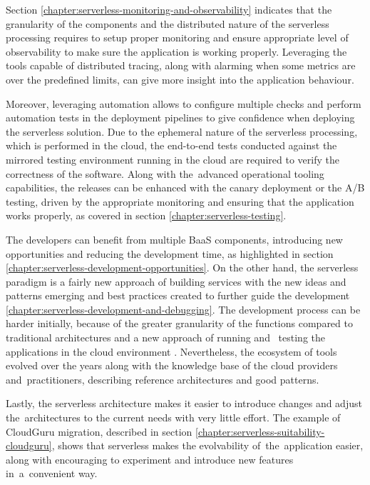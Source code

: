 Section \ref{chapter:serverless-monitoring-and-observability} indicates that the granularity of the components and the distributed nature of the serverless processing requires to setup proper monitoring and ensure appropriate level of observability to make sure the application is working properly.
Leveraging the tools capable of distributed tracing, along with alarming when some metrics are over the predefined limits, can give more insight into the application behaviour.

Moreover, leveraging automation allows to configure multiple checks and perform automation tests in the deployment pipelines to give confidence when deploying the serverless solution. Due to the ephemeral nature of the serverless processing, which is performed in the cloud, the end-to-end tests conducted against the mirrored testing environment running in the cloud are required to verify the correctness of the software. Along with the~advanced operational tooling capabilities, the releases can be enhanced with the canary deployment or the A/B testing, driven by the appropriate monitoring and ensuring that the application works properly, as covered in section \ref{chapter:serverless-testing}.

The developers can benefit from multiple BaaS components, introducing new opportunities and reducing the development time, as highlighted in section \ref{chapter:serverless-development-opportunities}. On the other hand, the serverless paradigm is a fairly new approach of building services with the new ideas and patterns emerging and best practices created to further guide the development \ref{chapter:serverless-development-and-debugging}.
The development process can be harder initially, because of the greater granularity of the functions compared to traditional architectures and a new approach of running and ~testing the applications in the cloud environment \cite{EvaluationOfServerlessApplicationProgrammingModel}. Nevertheless, the ecosystem of tools evolved over the years along with the knowledge base of the cloud providers and~practitioners, describing reference architectures and good patterns.

Lastly, the serverless architecture makes it easier to introduce changes and adjust the~architectures to the current needs with very little effort. The example of CloudGuru migration, described in section \ref{chapter:serverless-suitability-cloudguru}, shows that serverless makes the evolvability of~the~application easier, along with encouraging to experiment and introduce new features in~a~convenient way.

